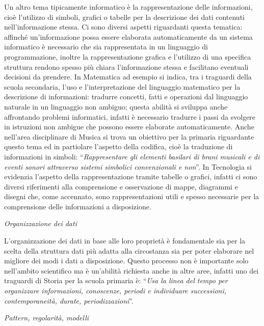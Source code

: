 \documentclass[12pt]{report}
\begin{document}
\noindent Un altro tema tipicamente informatico è la rappresentazione delle informazioni, cioè l'utilizzo di simboli, grafici o tabelle per la descrizione dei dati contenuti nell'informazione stessa. Ci sono diversi aspetti riguardanti questa tematica: affinché un'informazione possa essere elaborata automaticamente da un sistema informatico è necessario che sia rappresentata in un linguaggio di programmazione, inoltre la rappresentazione grafica e l'utilizzo di una specifica struttura rendono spesso più chiara l'informazione stessa e facilitano eventuali decisioni da prendere.
In Matematica ad esempio si indica, tra i traguardi della scuola secondaria, l'uso e l'interpretazione del linguaggio matematico per la descrizione di informazioni: tradurre concetti, fatti e operazioni dal linguaggio naturale in un linguaggio non ambiguo; questa abilità si sviluppa anche affrontando problemi informatici, infatti è necessario tradurre i passi da svolgere in istruzioni non ambigue che possono essere elaborate automaticamente. Anche nell'area disciplinare di Musica si trova un obiettivo per la primaria riguardante questo tema ed in partiolare l'aspetto della codifica, cioè la traduzione di informazioni in simboli: ``\textit{Rappresentare gli elementi basilari di brani musicali e di eventi sonori attraverso sistemi simbolici convenzionali e non}''. In Tecnologia si evidenzia l'aspetto della rappresentazione tramite tabelle o grafici, infatti ci sono diversi riferimenti alla comprensione e osservazione di mappe, diagrammi e disegni che, come accennato, sono rappresentazioni utili e spesso necessarie per la comprensione delle informazioni a disposizione.

\bigskip
\textit{Organizzazione dei dati}

\noindent L'organizzazione dei dati in base alle loro proprietà è fondamentale sia per la scelta della struttura dati più adatta alla circostanza sia per poter elaborare nel migliore dei modi i dati a disposizione. Questo processo non è importante solo nell'ambito scientifico ma è un'abilità richiesta anche in altre aree, infatti uno dei traguardi di Storia per la scuola primaria è: ``\textit{Usa la linea del tempo per organizzare informazioni, conoscenze, periodi e individuare successioni, contemporaneità, durate, periodizzazioni}''.

\bigskip
\textit{Pattern, regolarità, modelli}
\end{document}
